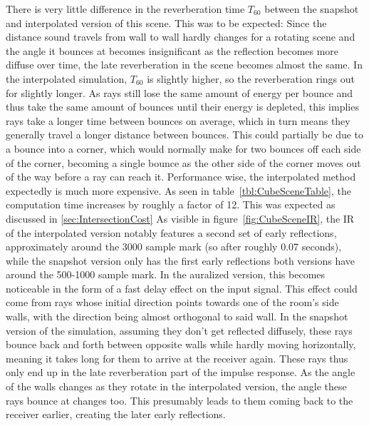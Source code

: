 There is very little difference in the reverberation time \(T_{60}\) between the snapshot and interpolated version of this scene.
This was to be expected: Since the distance sound travels from wall to wall hardly changes for a rotating scene
and the angle it bounces at becomes insignificant as the reflection becomes more diffuse over time,
the late reverberation in the scene becomes almost the same.
In the interpolated simulation, \(T_{60}\) is slightly higher,
so the reverberation rings out for slightly longer.
\newline
As rays still lose the same amount of energy per bounce
and thus take the same amount of bounces until their energy is depleted,
this implies rays take a longer time between bounces on average,
which in turn means they generally travel a longer distance between bounces.
\newline
This could partially be due to a bounce into a corner,
which would normally make for two bounces off each side of the corner,
becoming a single bounce as the other side of the corner moves out of the way before a ray can reach it.
\newline
Performance wise, the interpolated method expectedly is much more expensive.
As seen in table~\ref{tbl:CubeSceneTable}, the computation time increases by roughly a factor of 12.
This was expected as discussed in \autoref{sec:IntersectionCost}
\newline
As visible in figure~\ref{fig:CubeSceneIR}, the IR of the interpolated version notably features a second set of early reflections,
approximately around the 3000 sample mark (so after roughly 0.07 seconds),
while the snapshot version only has the first early reflections both versions have around the 500-1000 sample mark.
In the auralized version, this becomes noticeable in the form of a fast delay effect on the input signal.
\newline
This effect could come from rays whose initial direction points towards one of the room's side walls,
with the direction being almost orthogonal to said wall.
In the snapshot version of the simulation, assuming they don't get reflected diffusely,
these rays bounce back and forth between opposite walls while hardly moving horizontally,
meaning it takes long for them to arrive at the receiver again.
These rays thus only end up in the late reverberation part of the impulse response.
\newline
As the angle of the walls changes as they rotate in the interpolated version,
the angle these rays bounce at changes too.
This presumably leads to them coming back to the receiver earlier, creating the later early reflections.

